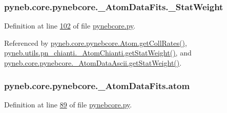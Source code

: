 \hypertarget{classpyneb_1_1core_1_1pynebcore_1_1___atom_data_fits_a8bee4fc914c9542b85e4750eb63b7aa0}{
\subsubsection[{\-\_\-\-Stat\-Weight}]{\setlength{\rightskip}{0pt plus 5cm}pyneb.\-core.\-pynebcore.\-\_\-\-Atom\-Data\-Fits.\-\_\-\-Stat\-Weight\hspace{0.3cm}{\ttfamily [private]}}}\label{classpyneb_1_1core_1_1pynebcore_1_1___atom_data_fits_a8bee4fc914c9542b85e4750eb63b7aa0}


Definition at line \hyperlink{pynebcore_8py_source_l00102}{102} of file \hyperlink{pynebcore_8py_source}{pynebcore.\-py}.



Referenced by \hyperlink{pynebcore_8py_source_l01394}{pyneb.\-core.\-pynebcore.\-Atom.\-get\-Coll\-Rates()}, \hyperlink{pn__chianti_8py_source_l00343}{pyneb.\-utils.\-pn\-\_\-chianti.\-\_\-\-Atom\-Chianti.\-get\-Stat\-Weight()}, and \hyperlink{pynebcore_8py_source_l00514}{pyneb.\-core.\-pynebcore.\-\_\-\-Atom\-Data\-Ascii.\-get\-Stat\-Weight()}.

\hypertarget{classpyneb_1_1core_1_1pynebcore_1_1___atom_data_fits_a489ba89fa2e99786afc077e82acace4c}{
\subsubsection[{atom}]{\setlength{\rightskip}{0pt plus 5cm}pyneb.\-core.\-pynebcore.\-\_\-\-Atom\-Data\-Fits.\-atom}}\label{classpyneb_1_1core_1_1pynebcore_1_1___atom_data_fits_a489ba89fa2e99786afc077e82acace4c}


Definition at line \hyperlink{pynebcore_8py_source_l00089}{89} of file \hyperlink{pynebcore_8py_source}{pynebcore.\-py}.



